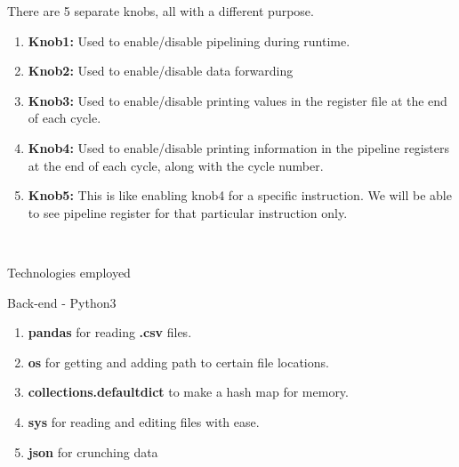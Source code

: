 \documentclass{article}
\begin{document}
There are 5 separate knobs, all with a different purpose.\\
\begin{enumerate}
  \item {\bf Knob1:} Used to enable/disable pipelining during runtime. 
  \item {\bf Knob2:} Used to enable/disable data forwarding
  \item {\bf Knob3:} Used to enable/disable printing values in the register file at the end of each cycle.
  \item {\bf Knob4:} Used to enable/disable printing information in the pipeline registers at the end of each cycle, along with the cycle number.
  \item {\bf Knob5:} This is like enabling knob4 for a specific instruction. We will be able to see pipeline register for that particular instruction only.
\end{enumerate}\\
\newpage
\begin{centering}
\begin{Huge}
\begin{bf}
\vspace{2.0cm}
\textsf{Technologies employed}\\
\end{bf}
\end{Huge}
\end{centering}
\protect\vspace{2.0cm}
\textbf{}
\huge
Back-end - Python3
\begin{enumerate}
  \item {\bf pandas} for reading {\bf .csv} files.
  \item {\bf os} for getting and adding path to certain file locations.
  \item {\bf collections.defaultdict} to make a hash map for memory.
  \item {\bf sys} for reading and editing files with ease.
  \item {\bf json} for crunching data
\end{enumerate}\\
\textbf{}
\end{document}
